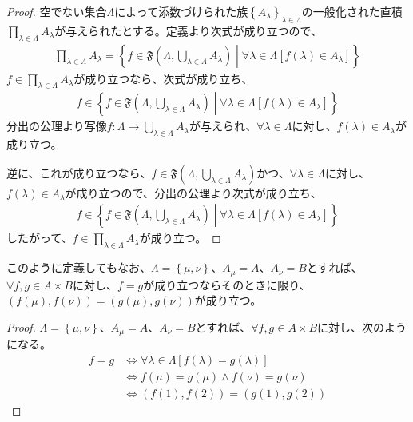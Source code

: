 \documentclass[a4paper]{jsarticle}
\begin{document}
\begin{proof}
空でない集合$\varLambda$によって添数づけられた族$\left\{ A_{\lambda} \right\}_{\lambda \in \varLambda}$の一般化された直積$\prod_{\lambda \in \varLambda} A_{\lambda}$が与えられたとする。定義より次式が成り立つので、
\begin{align*}
\prod_{\lambda \in \varLambda} A_{\lambda} = \left\{ f \in \mathfrak{F}\left( \varLambda,\bigcup_{\lambda \in \varLambda} A_{\lambda} \right) \middle| \forall\lambda \in \varLambda\left[ f(\lambda) \in A_{\lambda} \right] \right\}
\end{align*}
$f \in \prod_{\lambda \in \varLambda} A_{\lambda}$が成り立つなら、次式が成り立ち、
\begin{align*}
f \in \left\{ f \in \mathfrak{F}\left( \varLambda,\bigcup_{\lambda \in \varLambda} A_{\lambda} \right) \middle| \forall\lambda \in \varLambda\left[ f(\lambda) \in A_{\lambda} \right] \right\}
\end{align*}
分出の公理より写像$f:\varLambda \rightarrow \bigcup_{\lambda \in \varLambda} A_{\lambda}$が与えられ、$\forall\lambda \in \varLambda$に対し、$f(\lambda) \in A_{\lambda}$が成り立つ。\par
逆に、これが成り立つなら、$f \in \mathfrak{F}\left( \varLambda,\bigcup_{\lambda \in \varLambda} A_{\lambda} \right)$かつ、$\forall\lambda \in \varLambda$に対し、$f(\lambda) \in A_{\lambda}$が成り立つので、分出の公理より次式が成り立ち、
\begin{align*}
f \in \left\{ f \in \mathfrak{F}\left( \varLambda,\bigcup_{\lambda \in \varLambda} A_{\lambda} \right) \middle| \forall\lambda \in \varLambda\left[ f(\lambda) \in A_{\lambda} \right] \right\}
\end{align*}
したがって、$f \in \prod_{\lambda \in \varLambda} A_{\lambda}$が成り立つ。
\end{proof}
\begin{thm}
\label{1.2.1.20}
このように定義してもなお、$\varLambda = \left\{ \mu,\nu \right\}$、$A_{\mu} = A$、$A_{\nu} = B$とすれば、$\forall f,g \in A \times B$に対し、$f = g$が成り立つならそのときに限り、$\left( f(\mu),f(\nu) \right) = \left( g(\mu),g(\nu) \right)$が成り立つ。
\end{thm}
\begin{proof}
$\varLambda = \left\{ \mu,\nu \right\}$、$A_{\mu} = A$、$A_{\nu} = B$とすれば、$\forall f,g \in A \times B$に対し、次のようになる。
\begin{align*}
f = g &\Leftrightarrow \forall\lambda \in \varLambda\left[ f(\lambda) = g(\lambda) \right]\\
&\Leftrightarrow f(\mu) = g(\mu) \land f(\nu) = g(\nu)\\
&\Leftrightarrow \left( f(1),f(2) \right) = \left( g(1),g(2) \right)
\end{align*}
\end{proof}
\end{document}
